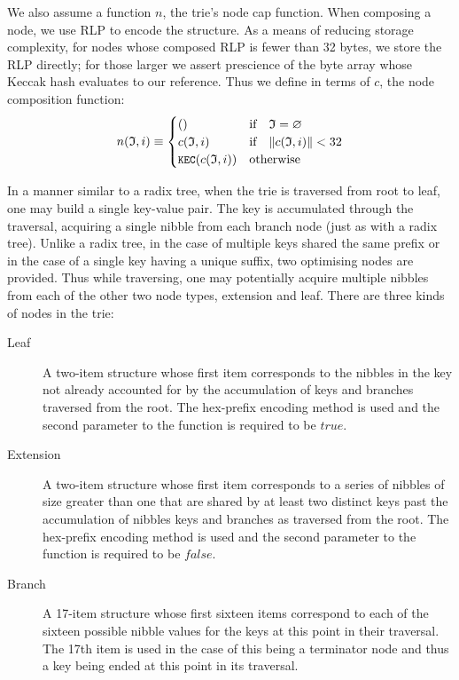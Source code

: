 \documentclass[9pt,oneside]{amsart}
\begin{document}
We also assume a function $n$, the trie's node cap function. When composing a node, we use RLP to encode the structure. As a means of reducing storage complexity, for nodes whose composed RLP is fewer than 32 bytes, we store the RLP directly; for those larger we assert prescience of the byte array whose Keccak hash evaluates to our reference. Thus we define in terms of $c$, the node composition function:
\begin{equation}
n(\mathfrak{I}, i) \equiv \begin{cases}
() & \text{if} \quad \mathfrak{I} = \varnothing \\
c(\mathfrak{I}, i) & \text{if} \quad \lVert c(\mathfrak{I}, i)\rVert < 32 \\
\texttt{\small KEC}(c(\mathfrak{I}, i)) & \text{otherwise}
\end{cases}
\end{equation}

In a manner similar to a radix tree, when the trie is traversed from root to leaf, one may build a single key-value pair. The key is accumulated through the traversal, acquiring a single nibble from each branch node (just as with a radix tree). Unlike a radix tree, in the case of multiple keys shared the same prefix or in the case of a single key having a unique suffix, two optimising nodes are provided. Thus while traversing, one may potentially acquire multiple nibbles from each of the other two node types, extension and leaf. There are three kinds of nodes in the trie:
\begin{description}
\item[Leaf] A two-item structure whose first item corresponds to the nibbles in the key not already accounted for by the accumulation of keys and branches traversed from the root. The hex-prefix encoding method is used and the second parameter to the function is required to be $true$.
\item[Extension] A two-item structure whose first item corresponds to a series of nibbles of size greater than one that are shared by at least two distinct keys past the accumulation of nibbles keys and branches as traversed from the root. The hex-prefix encoding method is used and the second parameter to the function is required to be $false$.
\item[Branch] A 17-item structure whose first sixteen items correspond to each of the sixteen possible nibble values for the keys at this point in their traversal. The 17th item is used in the case of this being a terminator node and thus a key being ended at this point in its traversal.
\end{description}
\end{document}
